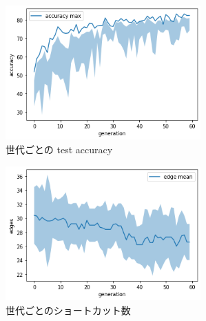 \documentclass[twocolumn]{jarticle}     %
\begin{document}
\begin{figure}[tb]
  \begin{center}
    \includegraphics[clip,width=75mm]{acc.png}
    \caption{世代ごとの test accuracy}
    \label{fig:acc}
  \end{center}
\end{figure}

\begin{figure}[tb]
  \begin{center}
    \includegraphics[clip,width=75mm]{edge.png}
    \caption{世代ごとのショートカット数}
    \label{fig:edge}
  \end{center}
\end{figure}
\end{document}
